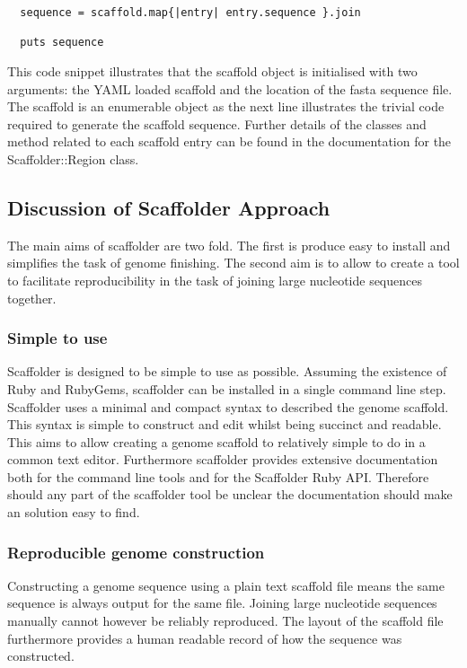\documentclass[10pt]{bmc_article}
\newenvironment{bmcformat}{\begin{raggedright}\baselineskip20pt\sloppy\setboolean{publ}{false}}{\end{raggedright}\baselineskip20pt\sloppy}
\begin{document}
\begin{bmcformat}
\begin{verbatim}
  sequence = scaffold.map{|entry| entry.sequence }.join

  puts sequence
\end{verbatim}

This code snippet illustrates that the scaffold object is initialised with two
arguments: the YAML loaded scaffold and the location of the fasta sequence
file. The scaffold is an enumerable object as the next line illustrates the
trivial code required to generate the scaffold sequence. Further details of
the classes and method related to each scaffold entry can be found in the
documentation for the Scaffolder::Region class. \pb

\subsection*{Discussion of Scaffolder Approach} %

The main aims of scaffolder are two fold. The first is produce easy to
install and simplifies the task of genome finishing. The second aim is to
allow to create a tool to facilitate reproducibility in the task of joining
large nucleotide sequences together. \pb

\subsubsection*{Simple to use}

Scaffolder is designed to be simple to use as possible. Assuming the existence
of Ruby and RubyGems, scaffolder can be installed in a single command line
step. Scaffolder uses a minimal and compact syntax to described the genome
scaffold. This syntax is simple to construct and edit whilst being succinct
and readable. This aims to allow creating a genome scaffold to relatively
simple to do in a common text editor. Furthermore scaffolder provides
extensive documentation both for the command line tools and for the Scaffolder
Ruby API. Therefore should any part of the scaffolder tool be unclear the
documentation should make an solution easy to find. \pb

\subsubsection*{Reproducible genome construction}

Constructing a genome sequence using a plain text scaffold file means the same
sequence is always output for the same file. Joining large nucleotide
sequences manually cannot however be reliably reproduced. The layout of the
scaffold file furthermore provides a human readable record of how the sequence
was constructed. \pb


\end{bmcformat}
\end{document}
